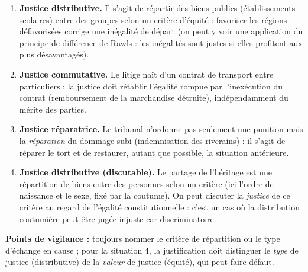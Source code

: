 \documentclass[11pt]{article}
\begin{document}
\begin{corrige}
\begin{enumerate}
\item \textbf{Justice distributive.} Il s'agit de répartir des biens publics (établissements scolaires) entre des groupes selon un critère d'équité : favoriser les régions défavorisées corrige une inégalité de départ (on peut y voir une application du principe de différence de Rawls : les inégalités sont justes si elles profitent aux plus désavantagés).
\item \textbf{Justice commutative.} Le litige naît d'un contrat de transport entre particuliers : la justice doit rétablir l'égalité rompue par l'inexécution du contrat (remboursement de la marchandise détruite), indépendamment du mérite des parties.
\item \textbf{Justice réparatrice.} Le tribunal n'ordonne pas seulement une punition mais la \emph{réparation} du dommage subi (indemnisation des riverains) : il s'agit de réparer le tort et de restaurer, autant que possible, la situation antérieure.
\item \textbf{Justice distributive (discutable).} Le partage de l'héritage est une répartition de biens entre des personnes selon un critère (ici l'ordre de naissance et le sexe, fixé par la coutume). On peut discuter la \emph{justice} de ce critère au regard de l'égalité constitutionnelle : c'est un cas où la distribution coutumière peut être jugée injuste car discriminatoire.
\end{enumerate}
\textbf{Points de vigilance :} toujours nommer le critère de répartition ou le type d'échange en cause ; pour la situation 4, la justification doit distinguer le \emph{type} de justice (distributive) de la \emph{valeur} de justice (équité), qui peut faire défaut.
\end{corrige}
\end{document}
